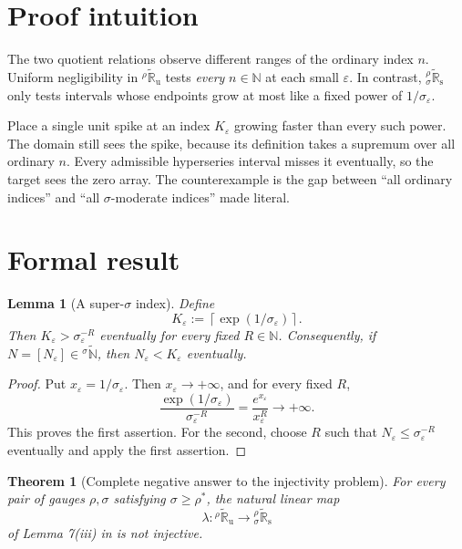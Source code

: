 \documentclass[11pt]{article}
\newtheorem{theorem}{Theorem}
\newtheorem{lemma}{Lemma}
\newcommand{\N}{\mathbb N}
\newcommand{\R}{\mathbb R}
\newcommand{\eps}{\varepsilon}
\newcommand{\Ru}{{}^{\rho}\widetilde{\R}_{\mathrm u}}
\newcommand{\Rs}{{}^{\rho}_{\sigma}\widetilde{\R}_{\mathrm s}}
\newcommand{\Ns}{{}^{\sigma}\widetilde{\N}}
\begin{document}
\section{Proof intuition}

The two quotient relations observe different ranges of the ordinary index
$n$.  Uniform negligibility in $\Ru$ tests \emph{every} $n\in\N$ at each
small $\eps$.  In contrast, $\Rs$ only tests intervals whose endpoints grow
at most like a fixed power of $1/\sigma_\eps$.

Place a single unit spike at an index $K_\eps$ growing faster than every such
power.  The domain still sees the spike, because its definition takes a
supremum over all ordinary $n$.  Every admissible hyperseries interval misses
it eventually, so the target sees the zero array.  The counterexample is the
gap between ``all ordinary indices'' and ``all $\sigma$-moderate indices''
made literal.

\section{Formal result}

\begin{lemma}[A super-$\sigma$ index]\label{lem:super}
Define
\[
                   K_\eps:=\left\lceil\exp(1/\sigma_\eps)\right\rceil.
\]
Then $K_\eps>\sigma_\eps^{-R}$ eventually for every fixed $R\in\N$.
Consequently, if $N=[N_\eps]\in\Ns$, then $N_\eps<K_\eps$ eventually.
\end{lemma}

\begin{proof}
Put $x_\eps=1/\sigma_\eps$.  Then $x_\eps\to+\infty$, and for every
fixed $R$,
\[
 \frac{\exp(1/\sigma_\eps)}{\sigma_\eps^{-R}}
   =\frac{e^{x_\eps}}{x_\eps^R}\longrightarrow+\infty.
\]
This proves the first assertion.  For the second, choose $R$ such that
$N_\eps\leq\sigma_\eps^{-R}$ eventually and apply the first assertion.
\end{proof}

\begin{theorem}[Complete negative answer to the injectivity problem]
\label{thm:main}
For every pair of gauges $\rho,\sigma$ satisfying $\sigma\geq\rho^*$, the
natural linear map
\[
                        \lambda:\Ru\longrightarrow\Rs
\]
of Lemma 7(iii) in \cite{TG} is not injective.
\end{theorem}
\end{document}

